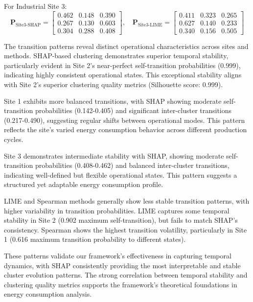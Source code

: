 \documentclass[final,5p,times,twocolumn,numbers]{elsarticle}
\begin{document}
For Industrial Site 3:
\begin{equation*}
\mathbf{P}_{\text{Site3-SHAP}} = \begin{bmatrix}
0.462 & 0.148 & 0.390 \\
0.267 & 0.130 & 0.603 \\
0.304 & 0.288 & 0.408
\end{bmatrix}, \quad
\mathbf{P}_{\text{Site3-LIME}} = \begin{bmatrix}
0.411 & 0.323 & 0.265 \\
0.627 & 0.140 & 0.233 \\
0.340 & 0.156 & 0.505
\end{bmatrix}
\end{equation*}

The transition patterns reveal distinct operational characteristics across sites and methods. SHAP-based clustering demonstrates superior temporal stability, particularly evident in Site 2's near-perfect self-transition probabilities (0.999), indicating highly consistent operational states. This exceptional stability aligns with Site 2's superior clustering quality metrics (Silhouette score: 0.999).

Site 1 exhibits more balanced transitions, with SHAP showing moderate self-transition probabilities (0.142-0.405) and significant inter-cluster transitions (0.217-0.490), suggesting regular shifts between operational modes. This pattern reflects the site's varied energy consumption behavior across different production cycles.

Site 3 demonstrates intermediate stability with SHAP, showing moderate self-transition probabilities (0.408-0.462) and balanced inter-cluster transitions, indicating well-defined but flexible operational states. This pattern suggests a structured yet adaptable energy consumption profile.

LIME and Spearman methods generally show less stable transition patterns, with higher variability in transition probabilities. LIME captures some temporal stability in Site 2 (0.902 maximum self-transition), but fails to match SHAP's consistency. Spearman shows the highest transition volatility, particularly in Site 1 (0.616 maximum transition probability to different states).

These patterns validate our framework's effectiveness in capturing temporal dynamics, with SHAP consistently providing the most interpretable and stable cluster evolution patterns. The strong correlation between temporal stability and clustering quality metrics supports the framework's theoretical foundations in energy consumption analysis.
\end{document}
